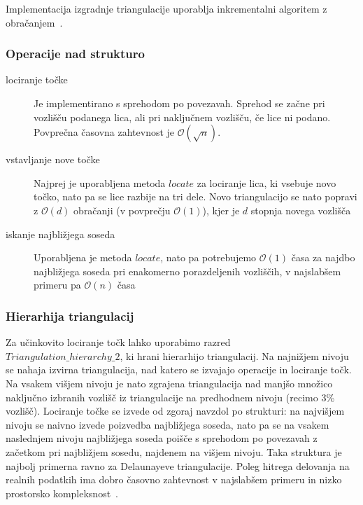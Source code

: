\documentclass[a4paper, 12pt]{book}
\newcommand{\OO}{\ensuremath{\mathcal{O}}} %
\newcommand{\U}{\texttt{\_}}
\begin{document}
Implementacija izgradnje triangulacije uporablja inkrementalni algoritem z obračanjem~\cite{cgal:y-t2-16b}.

\subsubsection{Operacije nad strukturo}
\begin{description}
\item[lociranje točke] Je implementirano s sprehodom po povezavah. Sprehod se začne pri vozlišču podanega lica, ali pri naključnem vozlišču, če lice ni podano. Povprečna časovna zahtevnost je $\OO(\sqrt{n})$.
\item[vstavljanje nove točke] Najprej je uporabljena metoda $locate$ za lociranje lica, ki vsebuje novo točko, nato pa se lice razbije na tri dele. Novo triangulacijo se nato popravi z $\OO(d)$ obračanji (v povprečju $\OO(1)$), kjer je $d$ stopnja novega vozlišča
\item[iskanje najbližjega soseda] Uporabljena je metoda $locate$, nato pa potrebujemo $\OO(1)$ časa za najdbo najbližjega soseda pri enakomerno porazdeljenih vozliščih, v najslabšem primeru pa $\OO(n)$ časa
\end{description}

\subsubsection{Hierarhija triangulacij}
Za učinkovito lociranje točk lahko uporabimo razred \\$Triangulation\U hierarchy\U 2$, ki hrani hierarhijo triangulacij. Na najnižjem nivoju se nahaja izvirna triangulacija, nad katero se izvajajo operacije in lociranje točk. Na vsakem višjem nivoju je nato zgrajena triangulacija nad manjšo množico naključno izbranih vozlišč iz triangulacije na predhodnem nivoju (recimo 3\% vozlišč). Lociranje točke se izvede od zgoraj navzdol po strukturi: na najvišjem nivoju se naivno izvede poizvedba najbližjega soseda, nato pa se na vsakem naslednjem nivoju najbližjega soseda poišče s sprehodom po povezavah z začetkom pri najbližjem sosedu, najdenem na višjem nivoju. Taka struktura je najbolj primerna ravno za Delaunayeve triangulacije. Poleg hitrega delovanja na realnih podatkih ima dobro časovno zahtevnost v najslabšem primeru in nizko prostorsko kompleksnost~\cite{Olivier}.
\end{document}

